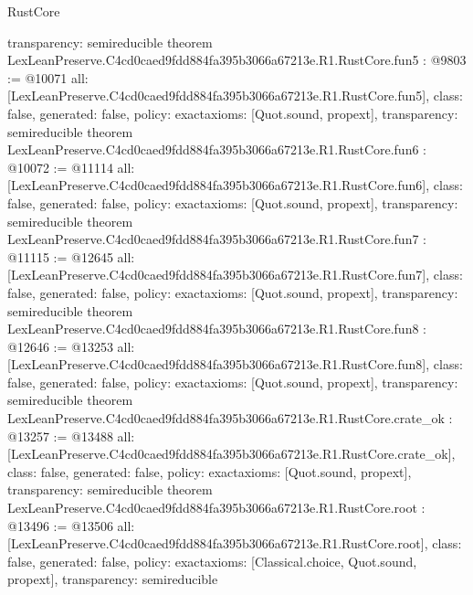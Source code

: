 \begin{lexlean}{RustCore}
\begin{coremodule}
{  transparency: semireducible
}
theorem LexLeanPreserve.C4cd0caed9fdd884fa395b3066a67213e.R1.RustCore.fun5 : @9803 := @10071 {
  all: [LexLeanPreserve.C4cd0caed9fdd884fa395b3066a67213e.R1.RustCore.fun5],
  class: false,
  generated: false,
  policy: exact{axioms: [Quot.sound, propext]},
  transparency: semireducible
}
theorem LexLeanPreserve.C4cd0caed9fdd884fa395b3066a67213e.R1.RustCore.fun6 : @10072 := @11114 {
  all: [LexLeanPreserve.C4cd0caed9fdd884fa395b3066a67213e.R1.RustCore.fun6],
  class: false,
  generated: false,
  policy: exact{axioms: [Quot.sound, propext]},
  transparency: semireducible
}
theorem LexLeanPreserve.C4cd0caed9fdd884fa395b3066a67213e.R1.RustCore.fun7 : @11115 := @12645 {
  all: [LexLeanPreserve.C4cd0caed9fdd884fa395b3066a67213e.R1.RustCore.fun7],
  class: false,
  generated: false,
  policy: exact{axioms: [Quot.sound, propext]},
  transparency: semireducible
}
theorem LexLeanPreserve.C4cd0caed9fdd884fa395b3066a67213e.R1.RustCore.fun8 : @12646 := @13253 {
  all: [LexLeanPreserve.C4cd0caed9fdd884fa395b3066a67213e.R1.RustCore.fun8],
  class: false,
  generated: false,
  policy: exact{axioms: [Quot.sound, propext]},
  transparency: semireducible
}
theorem LexLeanPreserve.C4cd0caed9fdd884fa395b3066a67213e.R1.RustCore.crate_ok : @13257 := @13488 {
  all: [LexLeanPreserve.C4cd0caed9fdd884fa395b3066a67213e.R1.RustCore.crate_ok],
  class: false,
  generated: false,
  policy: exact{axioms: [Quot.sound, propext]},
  transparency: semireducible
}
theorem LexLeanPreserve.C4cd0caed9fdd884fa395b3066a67213e.R1.RustCore.root : @13496 := @13506 {
  all: [LexLeanPreserve.C4cd0caed9fdd884fa395b3066a67213e.R1.RustCore.root],
  class: false,
  generated: false,
  policy: exact{axioms: [Classical.choice, Quot.sound, propext]},
  transparency: semireducible
}


\end{coremodule}
\end{lexlean}
